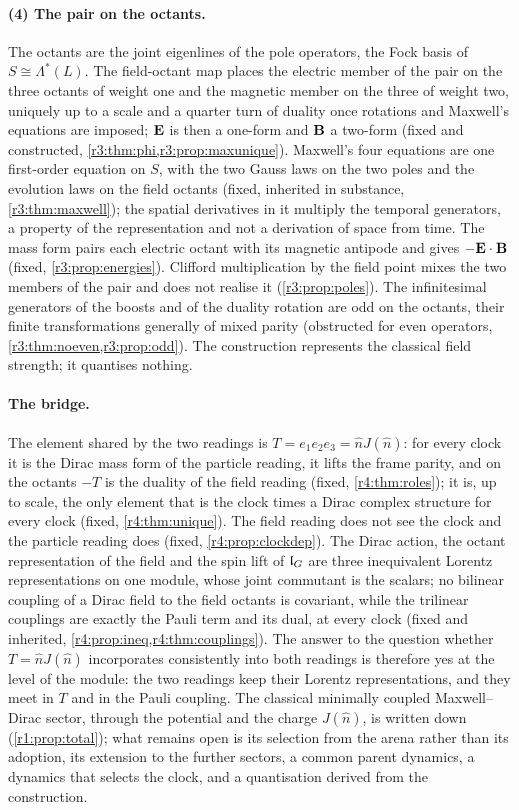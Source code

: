 \paragraph{(4) The pair on the octants.} The octants are the joint eigenlines of the pole operators, the Fock basis of $S\cong\Lambda^*(L)$.
The field-octant map places the electric member of the pair on the three octants of weight one and the magnetic member on the three of
weight two, uniquely up to a scale and a quarter turn of duality once rotations and Maxwell's equations are imposed; $\mathbf E$ is then a
one-form and $\mathbf B$ a two-form (fixed and constructed, \cref{r3:thm:phi,r3:prop:maxunique}). Maxwell's four equations are one first-order
equation on $S$, with the two Gauss laws on the two poles and the evolution laws on the field octants (fixed, inherited in substance,
\cref{r3:thm:maxwell}); the spatial derivatives in it multiply the temporal generators, a property of the representation and not a
derivation of space from time. The mass form pairs each electric octant with its magnetic antipode and gives $-\mathbf E\cdot\mathbf B$ (fixed,
\cref{r3:prop:energies}). Clifford multiplication by the field point mixes the two members of the pair and does not realise it
(\cref{r3:prop:poles}). The infinitesimal generators of the boosts and of the duality rotation are odd on the octants, their finite transformations generally of
mixed parity (obstructed for even operators,
\cref{r3:thm:noeven,r3:prop:odd}). The construction represents the classical field strength; it quantises nothing.

\paragraph{The bridge.} The element shared by the two readings is $T=e_1e_2e_3=\hat nJ(\hat n)$: for every clock it is the Dirac mass form of the
particle reading, it lifts the frame parity, and on the octants $-T$ is the duality of the field reading (fixed, \cref{r4:thm:roles}); it is,
up to scale, the only element that is the clock times a Dirac complex structure for every clock (fixed, \cref{r4:thm:unique}). The field
reading does not see the clock and the particle reading does (fixed, \cref{r4:prop:clockdep}). The Dirac action, the octant representation
of the field and the spin lift of $\mathfrak l_G$ are three inequivalent Lorentz representations on one module, whose joint commutant is the
scalars; no bilinear coupling of a Dirac field to the field octants is covariant, while the trilinear couplings are exactly the Pauli
term and its dual, at every clock (fixed and inherited, \cref{r4:prop:ineq,r4:thm:couplings}). The answer to the question whether $T=\hat nJ(\hat n)$
incorporates consistently into both readings is therefore yes at the level of the module: the two readings keep their Lorentz
representations, and they meet in $T$ and in the Pauli coupling. The classical minimally coupled Maxwell--Dirac sector, through the potential
and the charge $J(\hat n)$, is written down (\cref{r1:prop:total}); what remains open is its selection from the arena rather than its adoption,
its extension to the further sectors, a common parent dynamics, a dynamics that selects the clock, and a quantisation derived from the construction.

